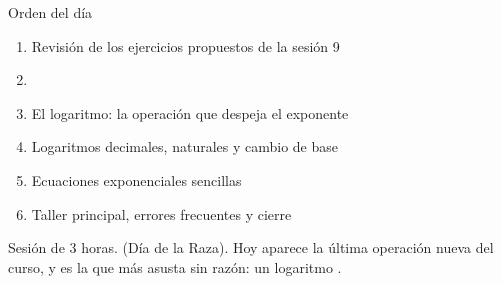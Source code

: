 \documentclass[aspectratio=169,10pt]{beamer}
\begin{document}
\portada

\begin{frame}{Orden del día}
  \begin{enumerate}
    \item Revisión de los ejercicios propuestos de la sesión 9
    \item {}
    \item El logaritmo: la operación que despeja el exponente
    \item Logaritmos decimales, naturales y cambio de base
    \item Ecuaciones exponenciales sencillas
    \item Taller principal, errores frecuentes y cierre
  \end{enumerate}

  \vspace{0.25cm}
  {\footnotesize\color{uniGris} Sesión de 3 horas.
   (Día de la Raza). Hoy aparece la última
  operación nueva del curso, y es la que más asusta sin razón: un logaritmo
  .}
\end{frame}

\end{document}
